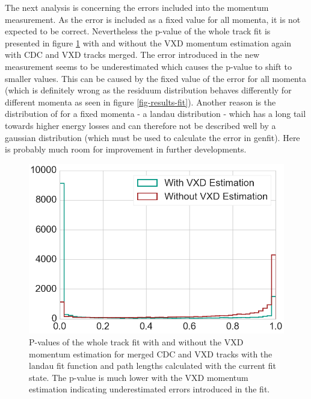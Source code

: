 


The next analysis is concerning the errors included into the momentum measurement. As the error is included as a fixed value for all momenta, it is not expected to be correct. Nevertheless the p-value of the whole track fit is presented in figure \ref{fig-p-values} with and without the VXD momentum estimation again with CDC and VXD tracks merged. The error introduced in the new measurement seems to be underestimated which causes the p-value to shift to smaller values. This can be caused by the fixed value of the error for all momenta (which is definitely wrong as the residuum distribution behaves differently for different momenta as seen in figure \ref{fig-results-fit}). Another reason is the distribution of \dedx for a fixed momenta - a landau distribution - which has a long tail towards higher energy losses and can therefore not be described well by a gaussian distribution (which must be used to calculate the error in genfit). Here is probably much room for improvement in further developments.

\begin{figure}
  \centering
  \includegraphics[width=0.7\linewidth]{figures/vxd/pValue.png}
  \caption[P-values of the whole track fit]{P-values of the whole track fit with and without the VXD momentum estimation for merged CDC and VXD tracks with the landau fit function and path lengths calculated with the current fit state. The p-value is much lower with the VXD momentum estimation indicating underestimated errors introduced in the fit.}
  \label{fig-p-values}
\end{figure}


